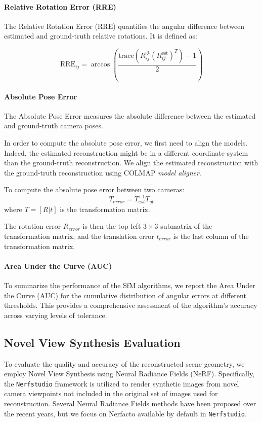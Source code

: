 \paragraph{Relative Rotation Error (RRE)}
The Relative Rotation Error (RRE) quantifies the angular difference between estimated and ground-truth relative rotations. It is defined as:

\begin{equation}
    \text{RRE}_{ij} = \arccos\left(\frac{\text{trace}(R_{ij}^{\text{gt}} (R_{ij}^{\text{est}})^T) - 1}{2}\right)
\end{equation}

\paragraph{Absolute Pose Error}
The Absolute Pose Error measures the absolute difference between the estimated and ground-truth camera poses.

In order to compute the absolute pose error, we first need to align the models. Indeed, the estimated reconstruction might be in a different coordinate system than the ground-truth reconstruction.
We align the estimated reconstruction with the ground-truth reconstruction using COLMAP \textit{model aligner}.

To compute the absolute pose error between two cameras:
\begin{equation}
    T_{error} = T_{est}^{-1} T_{gt}
\end{equation}
where $T = [R|t]$ is the transformation matrix.

The rotation error $R_{error}$ is then the top-left $3\times 3$ submatrix of the transformation matrix, and the translation error $t_{error}$ is the last column of the transformation matrix.


\paragraph{Area Under the Curve (AUC)}

To summarize the performance of the SfM algorithms, we report the Area Under the Curve (AUC) for the cumulative distribution of angular errors at different thresholds. 
This provides a comprehensive assessment of the algorithm's accuracy across varying levels of tolerance.


\subsection{Novel View Synthesis Evaluation}
To evaluate the quality and accuracy of the reconstructed scene geometry, we employ Novel View Synthesis using Neural Radiance Fields (NeRF). 
Specifically, the \texttt{Nerfstudio} \cite{nerfstudio} framework is utilized to render synthetic images from novel camera viewpoints not included in the original set of images used for reconstruction. 
Several Neural Radiance Fields methods have been proposed over the recent years, but we focus on Nerfacto available by default in \texttt{Nerfstudio}.

